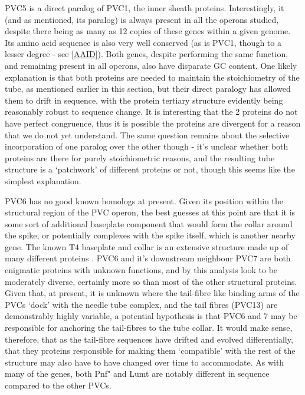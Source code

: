 PVC5 is a direct paralog of PVC1, the inner sheath proteins. Interestingly, it (and as mentioned, its paralog) is always present in all the operons studied, despite there being as many as 12 copies of these genes within a given genome. Its amino acid sequence is also very well conserved (as is PVC1, though to a lesser degree - see \vref{AAID}). Both genes, despite performing the same function, and remaining present in all operons, also have disparate GC content. One likely explanation is that both proteins are needed to maintain the stoichiometry of the tube, as mentioned earlier in this section, but their direct paralogy has allowed them to drift in sequence, with the protein tertiary structure evidently being reasonably robust to sequence change. It is interesting that the 2 proteins do not have perfect congruence, thus it is possible the proteins are divergent for a reason that we do not yet understand. The same question remains about the selective incorporation of one paralog over the other though - it's unclear whether both proteins are there for purely stoichiometric reasons, and the resulting tube structure is a `patchwork' of different proteins or not, though this seems like the simplest explanation.

PVC6 has no good known homologs at present. Given its position within the structural region of the PVC operon, the best guesses at this point are that it is some sort of additional baseplate component that would form the collar around the spike, or potentially complexes with the spike itself, which is another nearby gene. The known T4 baseplate and collar is an extensive structure made up of many different proteins \citep{Kostyuchenko2003}. PVC6 and it's downstream neighbour PVC7 are both enigmatic proteins with unknown functions, and by this analysis look to be moderately diverse, certainly more so than most of the other structural proteins. Given that, at present, it is unknown where the tail-fibre like binding arms of the PVCs `dock' with the needle tube complex, and the tail fibres (PVC13) are demonstrably highly variable, a potential hypothesis is that PVC6 and 7 may be responsible for anchoring the tail-fibres to the tube collar. It would make sense, therefore, that as the tail-fibre sequences have drifted and evolved differentially, that they proteins responsible for making them `compatible' with the rest of the structure may also have to have changed over time to accommodate. As with many of the genes, both Pnf" and Lumt are notably different in sequence compared to the other PVCs.

